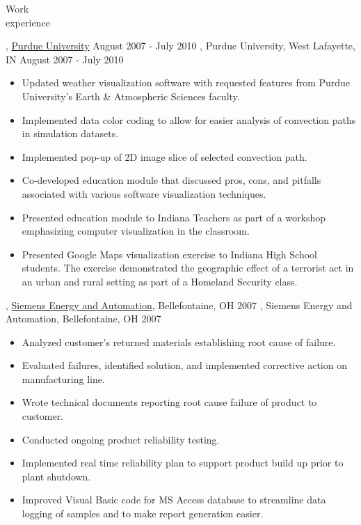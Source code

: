 \begin{category}{Work \\experience}

\ifWebLinks
{}, \href{http://www.purdue.edu}{Purdue University}  August 2007 - July 2010 
\else
{}, Purdue University, West Lafayette, IN  August 2007 - July 2010 
\fi

\begin{itemize}
\item Updated weather visualization software with requested features from Purdue University's Earth \& Atmospheric Sciences faculty.
\item Implemented data color coding to allow for easier analysis of convection paths in simulation datasets.
\item Implemented pop-up of 2D image slice of selected convection path. %
\item Co-developed education module that discussed pros, cons, and pitfalls associated with various software visualization techniques.
\item Presented education module to Indiana Teachers as part of a workshop emphasizing computer visualization in the classroom.
\item Presented Google Maps visualization exercise to Indiana High School students. The exercise demonstrated the geographic effect of a terrorist act in an urban and rural setting as part of a Homeland Security class.
\end{itemize}
\ifWebLinks
{}, \href{http://www.energy.siemens.com/entry/energy/hq/en/}{Siemens Energy and Automation}, Bellefontaine, OH  2007 
\else
{}, Siemens Energy and Automation, Bellefontaine, OH  2007 
\fi

\begin{itemize}
\item Analyzed customer's returned materials establishing root cause of failure.
\item Evaluated failures, identified solution, and implemented corrective action on manufacturing line.
\item Wrote technical documents reporting root cause failure of product to customer.
\item Conducted ongoing product reliability testing.
\item Implemented real time reliability plan to support product build up prior to plant shutdown.
\item Improved Visual Basic code for MS Access database to streamline data logging of samples and to make report generation easier.
\end{itemize}


\end{category}
